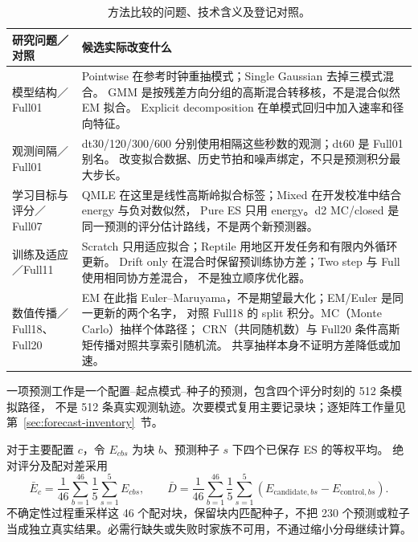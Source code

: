 \documentclass[UTF8,11pt]{ctexart}
\begin{document}
\begin{table}[htbp]
\centering\footnotesize
\caption{方法比较的问题、技术含义及登记对照。}
\label{tab:method-reader}
\begin{tabular}{@{}p{.22\linewidth}p{.69\linewidth}@{}}
\toprule
研究问题／对照 & 候选实际改变什么\\
\midrule
模型结构／Full01 &
Pointwise 在参考时钟重抽模式；Single Gaussian 去掉三模式混合。
GMM 是按残差方向分组的高斯混合转移核，不是混合似然 EM 拟合。
Explicit decomposition 在单模式回归中加入速率和径向特征。\\
观测间隔／Full01 &
dt30/120/300/600 分别使用相隔这些秒数的观测；dt60 是 Full01 别名。
改变拟合数据、历史节拍和噪声绑定，不只是预测积分最大步长。\\
学习目标与评分／Full07 &
QMLE 在这里是线性高斯岭拟合标签；Mixed 在开发校准中结合 energy 与负对数似然，
Pure ES 只用 energy。d2 MC/closed 是同一预测的评分估计路线，不是两个新预测器。\\
训练及适应／Full11 &
Scratch 只用适应拟合；Reptile 用地区开发任务和有限内外循环更新。
Drift only 在混合时保留预训练协方差；Two step 与 Full 使用相同协方差混合，
不是独立顺序优化器。\\
数值传播／Full18、Full20 &
EM 在此指 Euler--Maruyama，不是期望最大化；EM/Euler 是同一更新的两个名字，
对照 Full18 的 split 积分。MC（Monte Carlo）抽样个体路径；
CRN（共同随机数）与 Full20 条件高斯矩传播对照共享索引随机流。
共享抽样本身不证明方差降低或加速。\\
\bottomrule
\end{tabular}
\end{table}

一项预测工作是一个配置--起点模式--种子的预测，包含四个评分时刻的 512 条模拟路径，
不是 512 条真实观测轨迹。次要模式复用主要记录块；逐矩阵工作量见
第~\ref{sec:forecast-inventory}~节。

对于主要配置 $c$，令 $E_{cbs}$ 为块 $b$、预测种子 $s$ 下四个已保存 ES 的等权平均。
绝对评分及配对差采用
\begin{equation}
\bar E_c=\frac{1}{46}\sum_{b=1}^{46}\frac{1}{5}\sum_{s=1}^{5}E_{cbs},
\qquad
\bar D=\frac{1}{46}\sum_{b=1}^{46}\frac{1}{5}\sum_{s=1}^{5}
(E_{\mathrm{candidate},bs}-E_{\mathrm{control},bs}).
\label{eq:primary-aggregation}
\end{equation}
不确定性过程重采样这 46 个配对块，保留块内匹配种子，不把 230 个预测或粒子
当成独立真实结果。必需行缺失或失败时家族不可用，不通过缩小分母继续计算。
\end{document}
